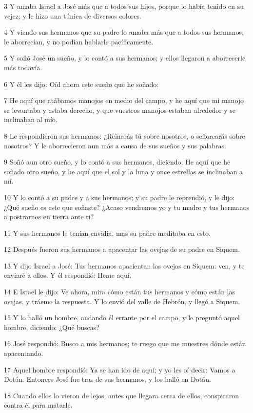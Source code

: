 3 Y amaba Israel a José más que a todos sus hijos, porque lo había tenido en su vejez; y le hizo una túnica de diversos colores.

4 Y viendo sus hermanos que su padre lo amaba más que a todos sus hermanos, le aborrecían, y no podían hablarle pacíficamente.

5 Y soñó José un sueño, y lo contó a sus hermanos; y ellos llegaron a aborrecerle más todavía.

6 Y él les dijo: Oíd ahora este sueño que he soñado:

7 He aquí que atábamos manojos en medio del campo, y he aquí que mi manojo se levantaba y estaba derecho, y que vuestros manojos estaban alrededor y se inclinaban al mío.

8 Le respondieron sus hermanos: ¿Reinarás tú sobre nosotros, o señorearás sobre nosotros? Y le aborrecieron aun más a causa de sus sueños y sus palabras.

9 Soñó aun otro sueño, y lo contó a sus hermanos, diciendo: He aquí que he soñado otro sueño, y he aquí que el sol y la luna y once estrellas se inclinaban a mí.

10 Y lo contó a su padre y a sus hermanos; y su padre le reprendió, y le dijo: ¿Qué sueño es este que soñaste? ¿Acaso vendremos yo y tu madre y tus hermanos a postrarnos en tierra ante ti?

11 Y sus hermanos le tenían envidia, mas su padre meditaba en esto.

12 Después fueron sus hermanos a apacentar las ovejas de su padre en Siquem.

13 Y dijo Israel a José: Tus hermanos apacientan las ovejas en Siquem: ven, y te enviaré a ellos. Y él respondió: Heme aquí.

14 E Israel le dijo: Ve ahora, mira cómo están tus hermanos y cómo están las ovejas, y tráeme la respuesta. Y lo envió del valle de Hebrón, y llegó a Siquem.

15 Y lo halló un hombre, andando él errante por el campo, y le preguntó aquel hombre, diciendo: ¿Qué buscas?

16 José respondió: Busco a mis hermanos; te ruego que me muestres dónde están apacentando.

17 Aquel hombre respondió: Ya se han ido de aquí; y yo les oí decir: Vamos a Dotán. Entonces José fue tras de sus hermanos, y los halló en Dotán.

18 Cuando ellos lo vieron de lejos, antes que llegara cerca de ellos, conspiraron contra él para matarle.

